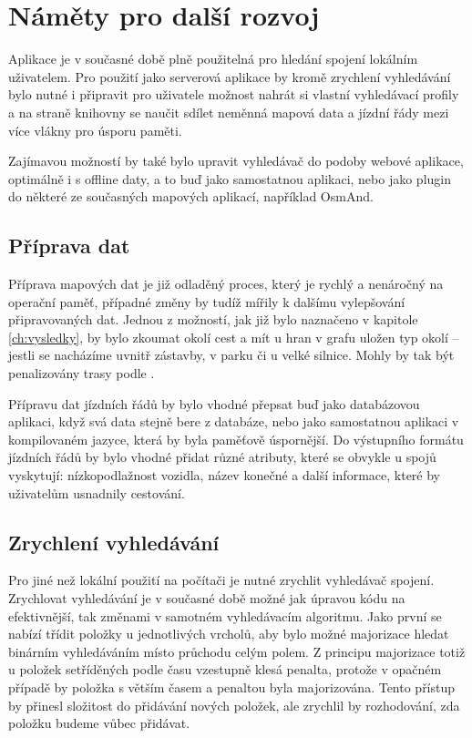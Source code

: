 \section{Náměty pro další rozvoj}
Aplikace je v současné době plně použitelná pro hledání spojení lokálním
uživatelem. Pro použití jako serverová aplikace by kromě zrychlení vyhledávání
bylo nutné i připravit pro uživatele možnost nahrát si vlastní vyhledávací
profily a na straně knihovny se naučit sdílet neměnná mapová data a jízdní řády
mezi více vlákny pro úsporu paměti. 

Zajímavou možností by také bylo upravit vyhledávač do podoby webové aplikace,
optimálně i s offline daty, a to buď jako samostatnou aplikaci, nebo jako plugin
do některé ze současných mapových aplikací, například OsmAnd.

\subsection{Příprava dat}
Příprava mapových dat je již odladěný proces, který je rychlý a nenáročný na
operační paměť, případné změny by tudíž mířily k dalšímu vylepšování
připravovaných dat. Jednou z možností, jak již bylo naznačeno v kapitole
\ref{ch:vysledky}, by bylo zkoumat okolí cest a mít u hran v grafu uložen typ
okolí -- jestli se nacházíme uvnitř zástavby, v parku či u velké silnice. Mohly
by tak být penalizovány trasy podle .

Přípravu dat jízdních řádů by bylo vhodné přepsat buď jako databázovou aplikaci,
když svá data stejně bere z databáze, nebo jako samostatnou aplikaci v
kompilovaném jazyce, která by byla paměťově úspornější. Do výstupního formátu
jízdních řádů by bylo vhodné přidat různé atributy, které se obvykle u spojů
vyskytují: nízkopodlažnost vozidla, název konečné a další informace, které by
uživatelům usnadnily cestování.

\subsection{Zrychlení vyhledávání}
Pro jiné než lokální použití na počítači je nutné zrychlit vyhledávač spojení.
Zrychlovat vyhledávání je v současné době možné jak úpravou kódu na
efektivnější, tak změnami v samotném vyhledávacím algoritmu. Jako první se
nabízí třídit položky u jednotlivých vrcholů, aby bylo možné majorizace hledat
binárním vyhledáváním místo průchodu celým polem. Z principu majorizace totiž u
položek setříděných podle času vzestupně klesá penalta, protože v opačném
případě by položka s větším časem a penaltou byla majorizována. Tento přístup by
přinesl složitost do přidávání nových položek, ale zrychlil by rozhodování, zda
položku budeme vůbec přidávat. 

